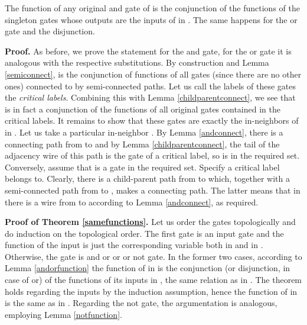 \documentclass{llncs}
\begin{document}
\begin{lemma} \label{andorfunction}
The function of any original {\sc and} gate  of 
is the conjunction of the functions of the singleton gates whose outputs are the inputs of  in .
The same happens for the {\sc or} gate and the disjunction. 
\end{lemma}

{\bf Proof.}
As before, we prove the statement for the {\sc and} gate, for the {\sc or} gate it is analogous with the respective substitutions. 
By construction and Lemma \ref{semiconnect}, 
is the conjunction of functions of all  gates (since there are no other ones) connected to  by semi-connected paths. 
Let us call the labels of these  gates the \emph{critical labels}. Combining this with Lemma \ref{childparentconnect}, we see that  is in fact a conjunction of the functions
of all original gates contained in the critical labels. It remains to show that
these gates are exactly the in-neighbors of  in . Let us take a particular in-neighbor .
By Lemma \ref{andconnect}, there is a connecting path from  to  and by Lemma \ref{childparentconnect},
the tail of the adjacency wire of this path is 
the  gate of a critical label, so  is in the required set. Conversely, assume that  is a gate in the required set.
Specify a critical label   belongs to. Clearly, there is a child-parent path from  to  which, together with a semi-connected path from  to , makes a connecting path. The latter means that in  there is a wire from  to  according to Lemma \ref{andconnect}, as required.



{\bf Proof of Theorem \ref{samefunctions}.}
Let us order the gates topologically and do induction on the topological order. The first gate is an input gate and the function of the input is just the corresponding variable both in  and in . Otherwise, the gate is {\sc and} or {\sc or} or {\sc not} gate. In the former two cases, according to Lemma \ref{andorfunction} the function of  in  is the conjunction (or disjunction, in case of {\sc or}) of the functions of its inputs in , the same relation as in . The theorem holds regarding the inputs by the induction assumption, hence the function of  in  is the same as in . Regarding the {\sc not} gate, the argumentation is analogous, employing Lemma \ref{notfunction}. 
\end{document}

